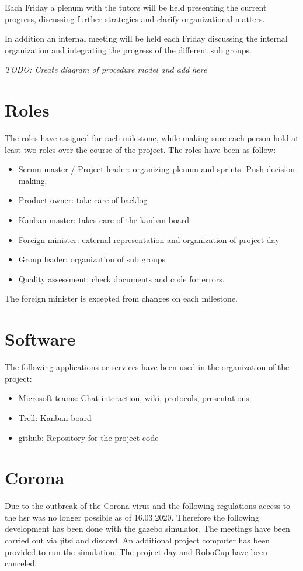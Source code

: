 \documentclass[main.tex]{subfiles}
\begin{document}
	Each Friday a plenum with the tutors will be held presenting the current progress, discussing further strategies and clarify organizational matters.
	
	In addition an internal meeting will be held each Friday discussing the internal organization and integrating the progress of the different sub groups.
	
	\textit{TODO: Create diagram of procedure model and add here}

	\section{Roles}
	The roles have assigned for each milestone, while making sure each person hold at least two roles over the course of the project. The roles have been as follow:
	\begin{itemize}
		\item Scrum master / Project leader: organizing plenum and sprints. Push decision making.
		\item Product owner: take care of backlog
		\item Kanban master: takes care of the kanban board
		\item Foreign minister: external representation and organization of project day
		\item Group leader: organization of sub groups
		\item Quality assessment: check documents and code for errors.
	\end{itemize}

	The foreign minister is excepted from changes on each milestone.
	
	\section{Software}
	The following applications or services have been used in the organization of the project:
	\begin{itemize}
		\item Microsoft teams: Chat interaction, wiki, protocols, presentations.
		\item Trell: Kanban board
		\item github: Repository for the project code
	\end{itemize}  

	\section{Corona}
	Due to the outbreak of the Corona virus and the following regulations access to the hsr was no longer possible as of 16.03.2020. Therefore the following development has been done with the gazebo simulator.
	The meetings have been carried out via jitsi and discord. An additional project computer has been provided to run the simulation.
	The project day and RoboCup have been canceled.
	
\end{document}
